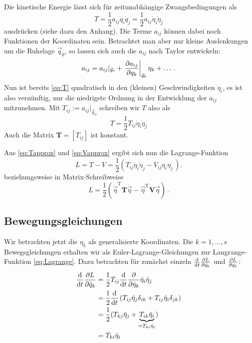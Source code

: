 \documentclass[paper=a4, fontsize=11.0pt, abstractoff, DIV12]{scrartcl}
\begin{document}
Die kinetische Energie lässt sich für zeitunabhängige Zwangsbedingungen als
\begin{equation}
T = \frac{1}{2} a_{ij} \dot{q}_i \dot{q}_j = \frac{1}{2} a_{ij} \dot{\eta}_i \dot{\eta}_j
\label{eq:T}
\end{equation}
ausdrücken (siehe dazu den Anhang). Die Terme $a_{ij}$ können dabei noch
Funktionen der Koordinaten sein. Betrachtet man aber nur kleine Auslenkungen um
die Ruhelage $\vec{q}_0$, so lassen sich auch die $a_{ij}$ nach Taylor entwickeln:
\begin{equation}
a_{ij} = a_{ij}\vert_{\vec{q}_0} + \left.\firstpderiv{a_{ij}}{q_k}\right|_{\vec{q}_0} \eta_k + \dots\, .
\end{equation}
Nun ist bereits \eqref{eq:T} quadratisch in den (kleinen) Geschwindigkeiten
$\dot{\eta}_i$, es ist also vernünftig, nur die niedrigste Ordnung in der
Entwicklung der $a_{ij}$ mitzunehmen. Mit $T_{ij} := a_{ij}\vert_{\vec{q}_0}$
schreiben wir $T$ also als
\begin{equation}
T = \frac{1}{2} T_{ij}\dot{\eta}_i\dot{\eta}_j
\label{eq:Tapprox}
\end{equation}
Auch die Matrix $\mathbf T = \left[T_{ij} \right]$ ist konstant.

Aus \eqref{eq:Tapprox} und \eqref{eq:Vapprox} ergibt sich nun die
Lagrange-Funktion
\begin{equation}
L = T-V= \frac{1}{2}\left(T_{ij} \dot{\eta}_i\dot{\eta}_j - V_{ij}\eta_i\eta_j\,\right) .
\label{eq:Lagrange}
\end{equation}
beziehungsweise in Matrix-Schreibweise
\begin{equation}
L = \frac{1}{2}\left(\dot{\vec{\eta}}^\mathrm{T}\mathbf{T}\dot{\vec{\eta}} - \vec{\eta}^\mathrm{T}\mathbf{V}\vec{\eta}\right)\,.
\label{eq:MatrixLagrange}
\end{equation}

\subsection{Bewegungsgleichungen}

Wir betrachten jetzt die $\eta_k$ als generalisierte Koordinaten. Die
$k=1, \dots, s$ Bewegsgleichungen erhalten wir als Euler-Lagrange-Gleichungen
zur Langrange-Funktion \eqref{eq:Lagrange}. Dazu betrachten für zunächst einzeln
$\frac{\mathrm{d}}{\mathrm{d}t}\frac{\partial L}{\partial \dot{q}_{k}}$ und $\frac{\partial L}{\partial q_k}$:
\begin{align}
\frac{\mathrm{d}}{\mathrm{d}t}\frac{\partial L}{\partial \dot{q}_k} &= \frac{1}{2}T_{ij}\frac{\mathrm{d}}{\mathrm{d}t} \frac{\partial }{\partial \dot{\eta}_k} \dot{\eta}_i \dot{\eta}_j\nonumber\\
&= \frac{1}{2}\frac{\mathrm{d}}{\mathrm{d}t} \left(T_{ij} \dot{\eta}_j\delta_{ik} + T_{ij}\dot{\eta}_i\delta_{jk} \right)\nonumber\\
&= \frac{1}{2}(T_{kj}\ddot{\eta}_j + \underbrace{T_{ik}\ddot{\eta}_i}_{=T_{ki}\ddot{\eta}_i})\nonumber\\
&= T_{ki} \ddot{\eta}_i
\label{eq:LGT}
\end{align}
\end{document}
